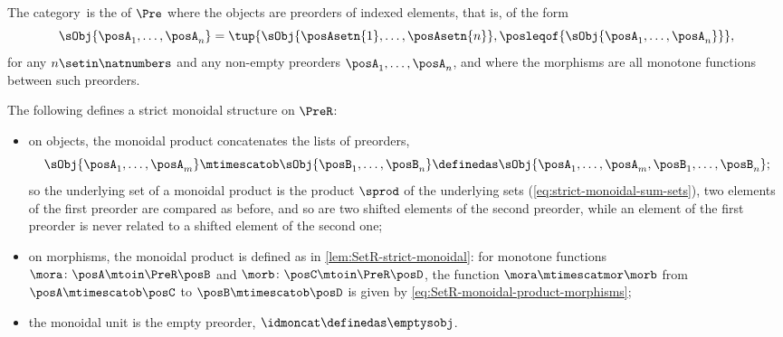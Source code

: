 \begin{definition}
    \label{def:PreR}
    The category~\PreR is the  of $\Pre$ where the objects are preorders of indexed elements, that is,  of the form
    \begin{equation}
        \sObj{\posA_1,\ldots, \posA_n} = \tup{\sObj{\posAsetn{1},\ldots, \posAsetn{n}}, \posleqof{\sObj{\posA_1,\ldots, \posA_n}}},
    \end{equation}
    for any $n \setin \natnumbers$ and any non-empty preorders $\posA_1,\ldots, \posA_n$, and where the morphisms are all monotone functions between such preorders.
\end{definition}

\begin{lemma}
    \label{lem:PreR-strict-monoidal}
    The following defines a strict monoidal structure on $\PreR$:
    \begin{itemize}
        \item on objects, the monoidal product concatenates the lists of preorders,
              \begin{equation}
                  \label{eq:multpresum}
                  \sObj{\posA_1,\ldots, \posA_m} \mtimescatob \sObj{\posB_1,\ldots, \posB_n} \definedas
                  \sObj{\posA_1,\ldots, \posA_m, \posB_1,\ldots, \posB_n};
              \end{equation}
              so the underlying set of a monoidal product is the product $\sprod$ of the underlying sets (\cref{eq:strict-monoidal-sum-sets}), two elements of the first preorder are compared as before, and so are two shifted elements of the second preorder, while an element of the first preorder is never related to a shifted element of the second one;
        \item on morphisms, the monoidal product is defined as in \cref{lem:SetR-strict-monoidal}: for monotone functions $\mora \colon \posA \mtoin\PreR \posB$ and $\morb \colon \posC \mtoin\PreR \posD$, the function $\mora \mtimescatmor \morb$ from $\posA \mtimescatob \posC$ to $\posB \mtimescatob \posD$ is given by \cref{eq:SetR-monoidal-product-morphisms};
        \item the monoidal unit is the empty preorder, $\idmoncat \definedas \emptysobj$.
    \end{itemize}
\end{lemma}

